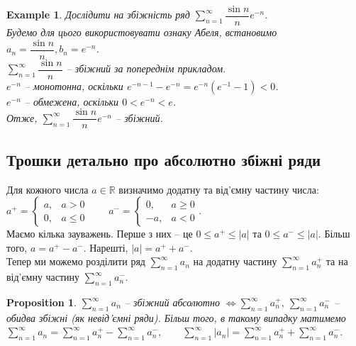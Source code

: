 \documentclass[a4paper, 10pt]{article}
\def\huge{\displaystyle}
\theoremstyle{theoremdd}
\theoremstyle{theoremdd}
\theoremstyle{theoremdd}
\theoremstyle{theoremdd}
\theoremstyle{theoremdd}
\newtheorem{example}[theorem]{Example}
\theoremstyle{theoremdd}
\newtheorem{proposition}[theorem]{Proposition}
\theoremstyle{theoremdd}
\theoremstyle{theoremdd}
\theoremstyle{theoremdd}
\begin{document}
\begin{example}
Дослідити на збіжність ряд $\huge\sum_{n=1}^\infty \dfrac{\sin n}{n} e^{-n}$.\\
Будемо для цього використовувати ознаку Абеля, встановимо $a_n = \dfrac{\sin n}{n}, b_n = e^{-n}$.\\
$\huge\sum_{n=1}^\infty \dfrac{\sin n}{n}$ -- збіжний за попереднім прикладом.\\
$e^{-n}$ -- монотонна, оскільки $e^{-n-1} - e^{-n} = e^{-n} (e^{-1} - 1) < 0$.\\
$e^{-n}$ -- обмежена, оскільки $0 < e^{-n} < e$.\\
Отже, $\huge\sum_{n=1}^\infty \dfrac{\sin n}{n} e^{-n}$ -- збіжний.
\end{example}

\subsection{Трошки детально про абсолютно збіжні ряди}
Для кожного числа $a \in \mathbb{R}$ визначимо додатну та від'ємну частину числа:\\
$a^+ = \begin{cases} a,& a > 0 \\ 0, & a \leq 0 \end{cases} \qquad a^- = \begin{cases} 0, & a \geq 0 \\ -a, & a < 0 \end{cases}$.\\
Маємо кілька зауважень. Перше з них -- це $0 \leq a^+ \leq |a|$ та $0 \leq a^- \leq |a|$. Більш того, $a = a^+ - a^-$. Нарешті, $|a| = a^+ + a^-$.\\
Тепер ми можемо розділити ряд $\displaystyle\sum_{n=1}^\infty a_n$ на додатну частину $\displaystyle\sum_{n=1}^\infty a_n^+$ та на від'ємну частину $\displaystyle\sum_{n=1}^\infty a_n^-$.

\begin{proposition}
$\displaystyle\sum_{n=1}^\infty a_n$ -- збіжний абсолютно $\iff \displaystyle\sum_{n=1}^\infty a_n^+,\ \sum_{n=1}^\infty a_n^-$ -- обидва збіжні (як невід'ємні ряди). Більш того, в такому випадку матимемо\\
$\displaystyle\sum_{n=1}^\infty a_n = \sum_{n=1}^\infty a_n^+ - \sum_{n=1}^\infty a_n^-, \qquad \sum_{n=1}^\infty |a_n| = \sum_{n=1}^\infty a_n^+ + \sum_{n=1}^\infty a_n^-$.
\end{proposition}
\end{document}
